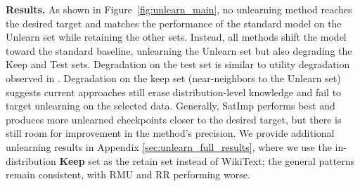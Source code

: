 \documentclass{article} %
\begin{document}
\textbf{Results.} As shown in Figure~\ref{fig:unlearn_main}, no unlearning method reaches the desired target and matches the performance of the standard model on the Unlearn set while retaining the other sets. Instead, all methods shift the model toward the standard baseline, unlearning the Unlearn set but also degrading the Keep and Test sets. Degradation on the test set is similar to utility degradation observed in \citet{muse}. Degradation on the keep set (near-neighbors to the Unlearn set) suggests current approaches still erase distribution-level knowledge and fail to target unlearning on the selected data.  Generally, SatImp performs best and produces more unlearned checkpoints closer to the desired target, but there is still room for improvement in the method's precision. We provide additional unlearning results in Appendix \ref{sec:unlearn_full_results}, where we use the in-distribution \textbf{Keep} set as the retain set instead of WikiText; the general patterns remain consistent, with RMU and RR performing worse. 





\end{document}

